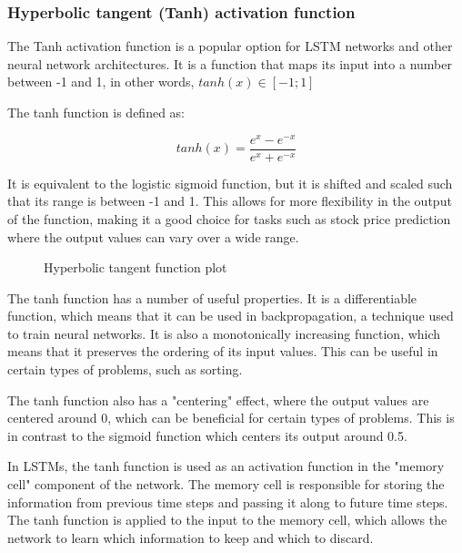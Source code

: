 \documentclass[a4paper]{article}
\begin{document}
\subsubsection{Hyperbolic tangent (Tanh) activation function} \label{tanh}

The Tanh activation function is a popular option for LSTM networks and other neural network architectures. It is a function that maps its input into a number between -1 and 1, in other words, $tanh(x) \in [-1;1]$

The tanh function is defined as:

$$
tanh(x) = \frac{e^x-e^{-x}}{e^x+e^{-x}}
$$

It is equivalent to the logistic sigmoid function, but it is shifted and scaled such that its range is between -1 and 1. This allows for more flexibility in the output of the function, making it a good choice for tasks such as stock price prediction where the output values can vary over a wide range.

\begin{figure}[!h]
\centering
{}
\caption{Hyperbolic tangent function plot}
\end{figure}

The tanh function has a number of useful properties. It is a differentiable function, which means that it can be used in backpropagation, a technique used to train neural networks. It is also a monotonically increasing function, which means that it preserves the ordering of its input values. This can be useful in certain types of problems, such as sorting.

The tanh function also has a "centering" effect, where the output values are centered around 0, which can be beneficial for certain types of problems. This is in contrast to the sigmoid function which centers its output around 0.5.

In LSTMs, the tanh function is used as an activation function in the "memory cell" component of the network. The memory cell is responsible for storing the information from previous time steps and passing it along to future time steps. The tanh function is applied to the input to the memory cell, which allows the network to learn which information to keep and which to discard.
\end{document}
